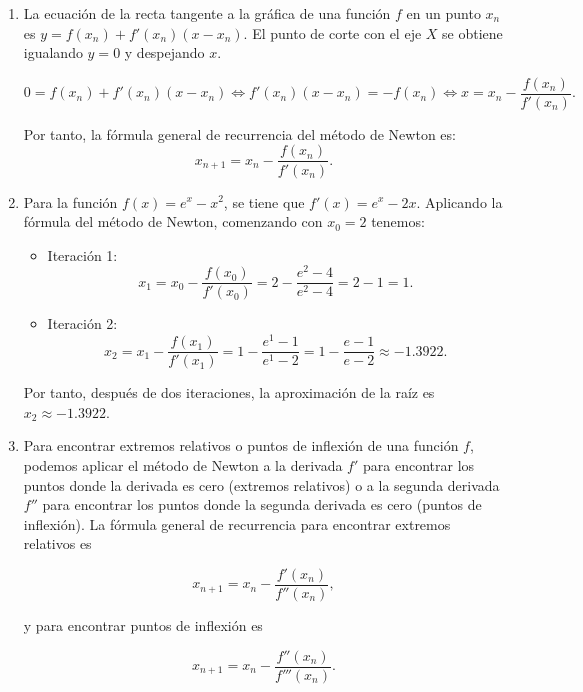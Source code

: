\documentclass[
  spanish,
  a4paper,
]{scrreport}
\theoremstyle{definition}
\theoremstyle{remark}
\begin{document}
\begin{tcolorbox}[enhanced jigsaw, arc=.35mm, bottomrule=.15mm, bottomtitle=1mm, breakable, colback=white, colbacktitle=quarto-callout-tip-color!10!white, colframe=quarto-callout-tip-color-frame, coltitle=black, left=2mm, leftrule=.75mm, opacityback=0, opacitybacktitle=0.6, rightrule=.15mm, title=\textcolor{quarto-callout-tip-color}{\faLightbulb}\hspace{0.5em}{Solución}, titlerule=0mm, toprule=.15mm, toptitle=1mm]

\begin{enumerate}
\def\labelenumi{\alph{enumi}.}
\item
  La ecuación de la recta tangente a la gráfica de una función \(f\) en
  un punto \(x_n\) es \(y = f(x_n) + f'(x_n)(x - x_n)\). El punto de
  corte con el eje \(X\) se obtiene igualando \(y=0\) y despejando
  \(x\).

  \[
  0 = f(x_n) + f'(x_n)(x - x_n)
  \Leftrightarrow f'(x_n)(x - x_n) = -f(x_n)
  \Leftrightarrow x = x_n - \frac{f(x_n)}{f'(x_n)}.
  \]

  Por tanto, la fórmula general de recurrencia del método de Newton es:
  \[
  x_{n+1} = x_n - \frac{f(x_n)}{f'(x_n)}.
  \]
\item
  Para la función \(f(x) = e^x - x^2\), se tiene que
  \(f'(x) = e^x - 2x\). Aplicando la fórmula del método de Newton,
  comenzando con \(x_0 = 2\) tenemos:

  \begin{itemize}
  \item
    Iteración 1: \[
    x_1 = x_0 - \frac{f(x_0)}{f'(x_0)} 
    = 2 - \frac{e^2 - 4}{e^2 - 4} 
    = 2 - 1 
    = 1.
    \]
  \item
    Iteración 2: \[
    x_2 = x_1 - \frac{f(x_1)}{f'(x_1)} 
    = 1 - \frac{e^1 - 1}{e^1 - 2} 
    = 1 - \frac{e - 1}{e - 2}
    \approx -1.3922.
    \]
  \end{itemize}

  Por tanto, después de dos iteraciones, la aproximación de la raíz es
  \(x_2 \approx -1.3922\).
\item
  Para encontrar extremos relativos o puntos de inflexión de una función
  \(f\), podemos aplicar el método de Newton a la derivada \(f'\) para
  encontrar los puntos donde la derivada es cero (extremos relativos) o
  a la segunda derivada \(f''\) para encontrar los puntos donde la
  segunda derivada es cero (puntos de inflexión). La fórmula general de
  recurrencia para encontrar extremos relativos es

  \[
  x_{n+1} = x_n - \frac{f'(x_n)}{f''(x_n)},
  \]

  y para encontrar puntos de inflexión es

  \[
  x_{n+1} = x_n - \frac{f''(x_n)}{f'''(x_n)}.
  \]
\end{enumerate}

\end{tcolorbox}
\end{document}
